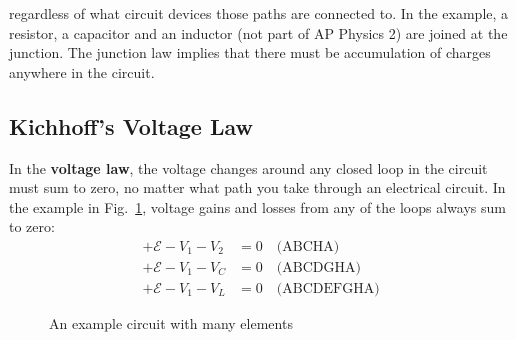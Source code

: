 %    
%
%
regardless of what circuit devices those paths are connected to. In the
example, a resistor, a capacitor and an inductor (not part of AP Physics 2) are
joined at the junction. The junction law implies that there must be
accumulation of charges anywhere in the circuit.



\subsection{Kichhoff's Voltage Law}

In the \textbf{voltage law}, the voltage changes around any closed loop in
the circuit must sum to zero, no matter what path you take through an
electrical circuit. In the example in Fig.~\ref{fig:voltage-law}, voltage gains
and losses from any of the loops always sum to zero:
\begin{align*}
  +\mathcal E-V_1-V_2 &= 0\quad\text{(ABCHA)}\\
  +\mathcal E-V_1-V_C &= 0\quad\text{(ABCDGHA)}\\
  +\mathcal E-V_1-V_L &=0\quad\text{(ABCDEFGHA)}
\end{align*}

\begin{figure}[ht]
  \centering
  \caption{An example circuit with many elements}
  \label{fig:voltage-law}
\end{figure}


